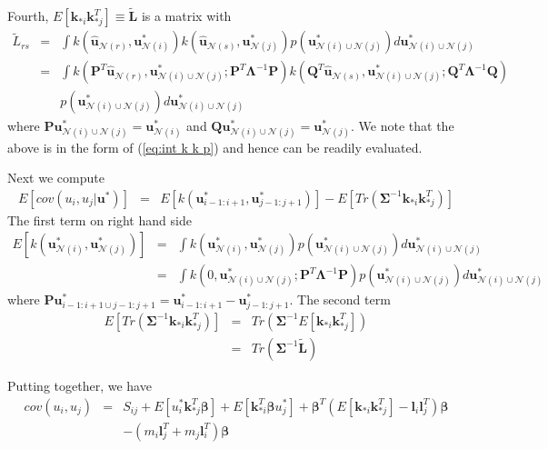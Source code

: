 \documentclass[11pt, reqno]{amsart}
\begin{document}
Fourth, $E[\mathbf{k}_{*i}\mathbf{k}_{*j}^{T}]\equiv\tilde{\mathbf{L}}$ is a matrix with 
\begin{eqnarray*}
\tilde{L}_{rs} & = & \int k(\hat{\mathbf{u}}_{\mathcal{N}(r)},\mathbf{u}_{\mathcal{N}(i)}^{*})k(\hat{\mathbf{u}}_{\mathcal{N}(s)},\mathbf{u}_{\mathcal{N}(j)}^{*})p(\mathbf{u}_{\mathcal{N}(i)\cup\mathcal{N}(j)}^{*})d\mathbf{u}_{\mathcal{N}(i)\cup\mathcal{N}(j)}^{*}\\
 & = & \int k(\mathbf{P}^{T}\hat{\mathbf{u}}_{\mathcal{N}(r)},\mathbf{u}_{\mathcal{N}(i)\cup\mathcal{N}(j)}^{*};\mathbf{P}^{T}\boldsymbol{\Lambda}^{-1}\mathbf{P})k(\mathbf{Q}^{T}\hat{\mathbf{u}}_{\mathcal{N}(s)},\mathbf{u}_{\mathcal{N}(i)\cup\mathcal{N}(j)}^{*};\mathbf{Q}^{T}\boldsymbol{\Lambda}^{-1}\mathbf{Q})\\
 & & p(\mathbf{u}_{\mathcal{N}(i)\cup\mathcal{N}(j)}^{*})d\mathbf{u}_{\mathcal{N}(i)\cup\mathcal{N}(j)}^{*}
\end{eqnarray*}
where $\mathbf{P}\mathbf{u}_{\mathcal{N}(i)\cup\mathcal{N}(j)}^{*}=\mathbf{u}_{\mathcal{N}(i)}^{*}$ and $\mathbf{Q}\mathbf{u}_{\mathcal{N}(i)\cup\mathcal{N}(j)}^{*}=\mathbf{u}_{\mathcal{N}(j)}^{*}$. We note that the above is in the form of (\ref{eq:int k k p}) and hence can be readily evaluated. 

Next we compute 
\begin{eqnarray*}
E[cov(u_{i},u_{j}\vert\mathbf{u}^{*})] & = & E[k(\mathbf{u}_{i-1:i+1}^{*},\mathbf{u}_{j-1:j+1}^{*})]-E[Tr(\mathbf{\Sigma}^{-1}\mathbf{k}_{*i}\mathbf{k}_{*j}^{T})]
\end{eqnarray*}
The first term on right hand side 
\begin{eqnarray*}
E[k(\mathbf{u}_{\mathcal{N}(i)}^{*},\mathbf{u}_{\mathcal{N}(j)}^{*})] & = & \int k(\mathbf{u}_{\mathcal{N}(i)}^{*},\mathbf{u}_{\mathcal{N}(j)}^{*})p(\mathbf{u}_{\mathcal{N}(i)\cup\mathcal{N}(j)}^{*})d\mathbf{u}_{\mathcal{N}(i)\cup\mathcal{N}(j)}^{*}\\
 & = & \int k(0,\mathbf{u}_{\mathcal{N}(i)\cup\mathcal{N}(j)}^{*};\mathbf{P}^{T}\boldsymbol{\Lambda}^{-1}\mathbf{P})p(\mathbf{u}_{\mathcal{N}(i)\cup\mathcal{N}(j)}^{*})d\mathbf{u}_{\mathcal{N}(i)\cup\mathcal{N}(j)}^{*}
\end{eqnarray*}
where $\mathbf{P}\mathbf{u}_{i-1:i+1\cup j-1:j+1}^{*}=\mathbf{u}_{i-1:i+1}^{*}-\mathbf{u}_{j-1:j+1}^{*}$. The second term
\begin{eqnarray*}
E[Tr(\mathbf{\Sigma}^{-1}\mathbf{k}_{*i}\mathbf{k}_{*j}^{T})] & = & Tr(\boldsymbol{\Sigma}^{-1}E[\mathbf{k}_{*i}\mathbf{k}_{*j}^{T}])\\
 & = & Tr(\boldsymbol{\Sigma}^{-1}\tilde{\mathbf{L}})
\end{eqnarray*}

Putting together, we have 
\begin{align}
cov(u_{i},u_{j}) & = & S_{ij}+E[u_{i}^{*}\mathbf{k}_{*j}^{T}\boldsymbol{\beta}]+E[\mathbf{k}_{*i}^{T}\boldsymbol{\beta}u_{j}^{*}]+\boldsymbol{\beta}^{T}(E[\mathbf{k}_{*i}\mathbf{k}_{*j}^{T}]-\mathbf{l}_{i}\mathbf{l}_{j}^{T})\boldsymbol{\beta} \nonumber \\
&  & -(m_{i}\mathbf{l}_{j}^{T}+m_{j}\mathbf{l}_{i}^{T})\boldsymbol{\beta} \label{eq:cov(u)}
\end{align}
\end{document}
